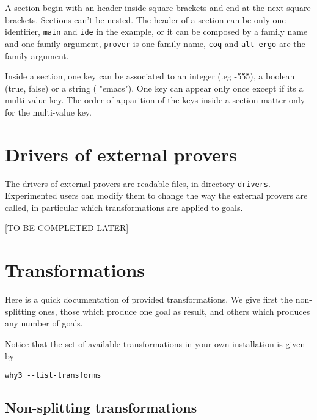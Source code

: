 A section begin with an header inside square brackets and end at the
next square brackets. Sections can't be nested. The header of a
section can be only one identifier, \texttt{main} and \texttt{ide} in
the example, or it can be composed by a family name and one family
argument, \texttt{prover} is one family name, \texttt{coq} and
\texttt{alt-ergo} are the family argument.

Inside a section, one key can be associated to an integer (.eg -555),
a boolean (true, false) or a string (\eg{} "emacs"). One key can appear
only once except if its a multi-value key. The order of apparition of
the keys inside a section matter only for the multi-value key.

\section{Drivers of external provers}
\label{sec:drivers}

The drivers of external provers are readable files, in directory
\texttt{drivers}. Experimented users can modify them to change the way
the external provers are called, in particular which transformations
are applied to goals.

[TO BE COMPLETED LATER]

\section{Transformations}
\label{sec:transformations}

Here is a quick documentation of provided transformations. We give
first the non-splitting ones, \eg{} those which produce one goal as
result, and others which produces any number of goals.

Notice that the set of available transformations in your own
installation is given by
\begin{verbatim}
why3 --list-transforms
\end{verbatim}

\subsection{Non-splitting transformations}

